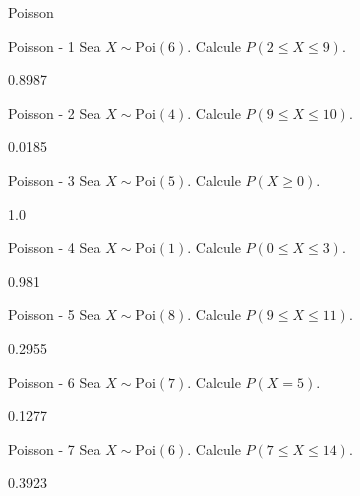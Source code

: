 \documentclass[a4,11pt]{aleph-notas}
\newcommand{\Poi}{\text{Poi}}
\begin{document}
\begin{quiz}{Poisson}

\begin{numerical}[tolerance=0.001]%
    {Poisson - 1}
    Sea \( X \sim \Poi(6) \). Calcule \( P(2 \leq X \leq 9) \).
    \item[] 0.8987
\end{numerical}

\begin{numerical}[tolerance=0.001]%
    {Poisson - 2}
    Sea \( X \sim \Poi(4) \). Calcule \( P(9 \leq X \leq 10) \).
    \item[] 0.0185
\end{numerical}

\begin{numerical}[tolerance=0.001]%
    {Poisson - 3}
    Sea \( X \sim \Poi(5) \). Calcule \( P(X \geq 0) \).
    \item[] 1.0
\end{numerical}

\begin{numerical}[tolerance=0.001]%
    {Poisson - 4}
    Sea \( X \sim \Poi(1) \). Calcule \( P(0 \leq X \leq 3) \).
    \item[] 0.981
\end{numerical}

\begin{numerical}[tolerance=0.001]%
    {Poisson - 5}
    Sea \( X \sim \Poi(8) \). Calcule \( P(9 \leq X \leq 11) \).
    \item[] 0.2955
\end{numerical}

\begin{numerical}[tolerance=0.001]%
    {Poisson - 6}
    Sea \( X \sim \Poi(7) \). Calcule \( P(X = 5) \).
    \item[] 0.1277
\end{numerical}

\begin{numerical}[tolerance=0.001]%
    {Poisson - 7}
    Sea \( X \sim \Poi(6) \). Calcule \( P(7 \leq X \leq 14) \).
    \item[] 0.3923
\end{numerical}


\end{quiz}
\end{document}
